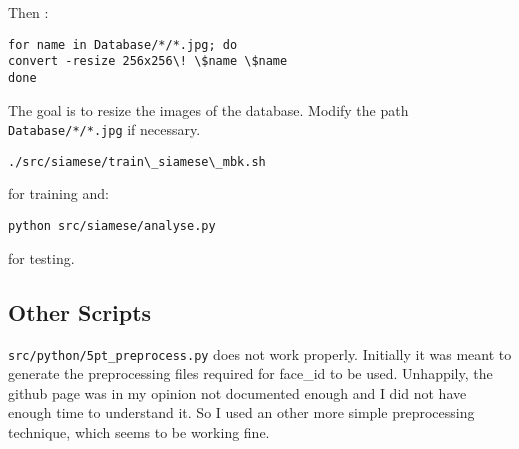 Then :\\
\begin{verbatim}
for name in Database/*/*.jpg; do
convert -resize 256x256\! \$name \$name
done
\end{verbatim}
The goal is to resize the images of the database. Modify the path \texttt{Database/*/*.jpg} if necessary.\\

\begin{verbatim}
./src/siamese/train\_siamese\_mbk.sh
\end{verbatim}
for training and:
\begin{verbatim}
python src/siamese/analyse.py
\end{verbatim}
for testing.

\subsection{Other Scripts}

\texttt{src/python/5pt\_preprocess.py} does not work properly. Initially it was meant to generate the preprocessing files required for face\_id to be used. Unhappily, the github page was in my opinion not documented enough and I did not have enough time to understand it. So I used an other more simple preprocessing technique, which seems to be working fine.
